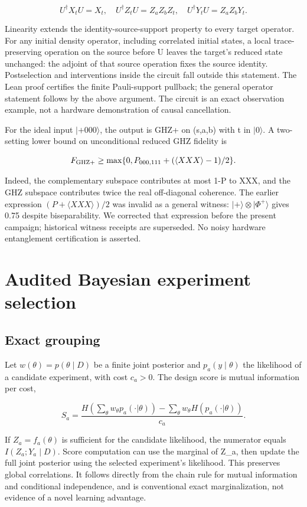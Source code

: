 \documentclass[11pt,a4paper]{article}
\begin{document}
\[
U^\dagger X_t U=X_t,\quad
U^\dagger Z_t U=Z_aZ_bZ_t,\quad
U^\dagger Y_t U=Z_aZ_bY_t.
\]

Linearity extends the identity-source-support property to every target operator. For any initial density operator, including correlated initial states, a local trace-preserving operation on the source before U leaves the target's reduced state unchanged: the adjoint of that source operation fixes the source identity. Postselection and interventions inside the circuit fall outside this statement. The Lean proof certifies the finite Pauli-support pullback; the general operator statement follows by the above argument. The circuit is an exact observation example, not a hardware demonstration of causal cancellation.

For the ideal input $|+000\rangle$, the output is GHZ+ on (s,a,b) with t in $|0\rangle$. A two-setting lower bound on unconditional reduced GHZ fidelity is

\[
F_{\rm GHZ+}\geq\max\{0,P_{000,111}+(\langle XXX\rangle-1)/2\}.
\]

Indeed, the complementary subspace contributes at most 1-P to XXX, and the GHZ subspace contributes twice the real off-diagonal coherence. The earlier expression $(P+\langle XXX\rangle)/2$ was invalid as a general witness: $|+\rangle\otimes|\Phi^+\rangle$ gives 0.75 despite biseparability. We corrected that expression before the present campaign; historical witness receipts are superseded. No noisy hardware entanglement certification is asserted.

\section{Audited Bayesian experiment selection}

\subsection{Exact grouping}

Let $w(\theta)=p(\theta\mid D)$ be a finite joint posterior and $p_a(y\mid\theta)$ the likelihood of a candidate experiment, with cost $c_a>0$. The design score is mutual information per cost,

\[
S_a=\frac{H(\sum_\theta w_\theta p_a(\cdot|\theta))-
\sum_\theta w_\theta H(p_a(\cdot|\theta))}{c_a}.
\]

If $Z_a=f_a(\theta)$ is sufficient for the candidate likelihood, the numerator equals $I(Z_a;Y_a\mid D)$. Score computation can use the marginal of Z\_a, then update the full joint posterior using the selected experiment's likelihood. This preserves global correlations. It follows directly from the chain rule for mutual information and conditional independence, and is conventional exact marginalization, not evidence of a novel learning advantage.
\end{document}
